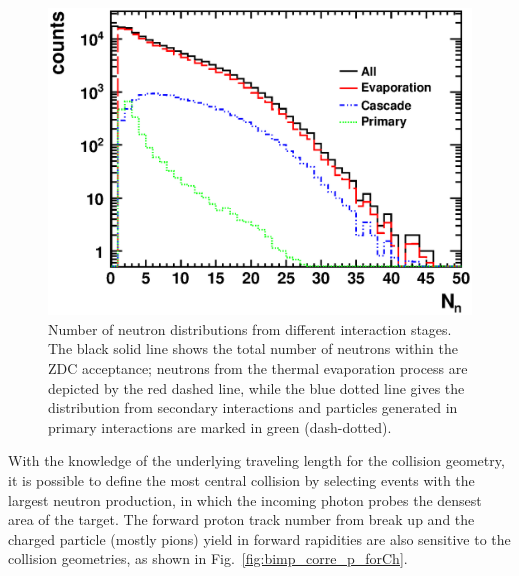 \begin{figure}
\begin{center}
\includegraphics[width=0.7\columnwidth]{plots/chpt7/accept_neutron_from_stages.eps}
\caption[Accepted neutron number distribution from different \eA\ collision stage]{Number of neutron distributions
from different interaction stages. The black solid line shows the total number of neutrons
within the ZDC acceptance; neutrons from the thermal evaporation process are depicted
by the red dashed line, while the blue dotted line gives the distribution from secondary
interactions and particles generated in primary interactions are marked in green (dash-dotted).}
\label{fig:neutronStage}
\end{center}
\end{figure}
With the knowledge of the underlying traveling length for the collision geometry,
it is possible to define the most central collision by selecting events with the
largest neutron production, in which the incoming photon probes the densest area
of the target. The forward proton track number from break up and the charged
particle (mostly pions) yield in forward rapidities are also sensitive to the
collision geometries, as shown in Fig.~\ref{fig:bimp_corre_p_forCh}. 


